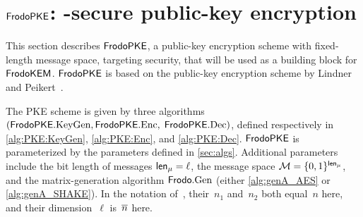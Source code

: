 \section{$\textsf{\upshape\mdseries FrodoPKE}$: \INDCPA-secure public-key encryption}%
\label{sec:cpa-pke}

This section describes $\textsf{\upshape\mdseries FrodoPKE}$, a public-key encryption scheme
with fixed-length message space, targeting \INDCPA security, that will
be used as a building block for $\textsf{\upshape\mdseries FrodoKEM}$. $\textsf{\upshape\mdseries FrodoPKE}$ is based on
the public-key encryption scheme by Lindner and Peikert~\cite{RSA:LinPei11}.


The PKE scheme is given by three algorithms
$(\textsf{\upshape\mdseries FrodoPKE}.\textrm{\upshape\mdseries KeyGen}, \textsf{\upshape\mdseries FrodoPKE}.\textrm{\upshape\mdseries Enc},$ $\textsf{\upshape\mdseries FrodoPKE}.\textrm{\upshape\mdseries Dec})$, defined
respectively in \autoref{alg:PKE:KeyGen}, \autoref{alg:PKE:Enc}, and
\autoref{alg:PKE:Dec}.  
$\textsf{\upshape\mdseries FrodoPKE}$ is parameterized by the parameters defined in \autoref{sec:algs}.
Additional parameters include the bit length of messages ${\mathsf{len}_{\mu}} = \ell$, the message space $\mathcal{M} = \{0,1\}^{\mathsf{len}_{\mu}}$,
and the matrix-generation algorithm $\textsf{\upshape\mdseries Frodo}.\textrm{\upshape\mdseries Gen}$ (either \autoref{alg:genA_AES} or \autoref{alg:genA_SHAKE}).
%
%
In the notation of~\cite{RSA:LinPei11}, their~$n_1$ and~$n_2$ both
equal~$n$ here, and their dimension~$\ell$ is~$\overline{n}$ here.


